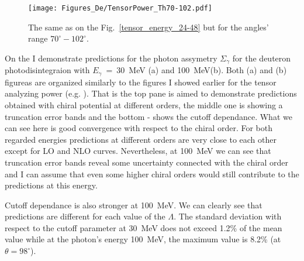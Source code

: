     \begin{figure}[h]
        \begin{center}
        \texttt{[image: Figures\_De/TensorPower\_Th70-102.pdf]}
        \end{center}
        \caption{The same as on the Fig.~\ref*{tensor_energy_24-48} but
        for the angles' range $70^{\circ} - 102^{\circ}$.}
        \label{tensor_energy_70-102}
    \end{figure}
    
    On the  I demonstrate predictions
    for the photon assymetry $\Sigma_\gamma$ for the 
    deuteron photodisintegraion with $E_\gamma$~=~30~MeV (a)
    and 100~MeV(b). Both (a) and (b) figureas are organized similarly to the 
    figures I showed earlier for the tensor analyzing power (e.g. ).
    That is the top pane is aimed to demonstrate predictions obtained
    with chiral potential at different orders, the middle 
    one is showing a truncation error bands and the bottom - shows 
    the cutoff dependance. What we can see here is good 
    convergence with respect to the chiral order. For both regarded 
    energies predictions at different orders are very close to each other
    except for LO and NLO curves. Nevertheless, at 100~MeV we can see 
    that truncation error bands reveal some uncertainty connected 
    with the chiral order and I can assume that even some higher chiral 
    orders would still contribute to the predictions at this energy.

    Cutoff dependance is also stronger at 100~MeV. We can clearly see
    that predictions are different for each value of the $\Lambda$.
    The standard deviation with respect to the cutoff parameter at 30~MeV
    does not exceed 1.2\% of the mean value while at the photon's energy 100~MeV,
     the maximum value is 8.2\% (at $\theta = 98^\circ$).  


